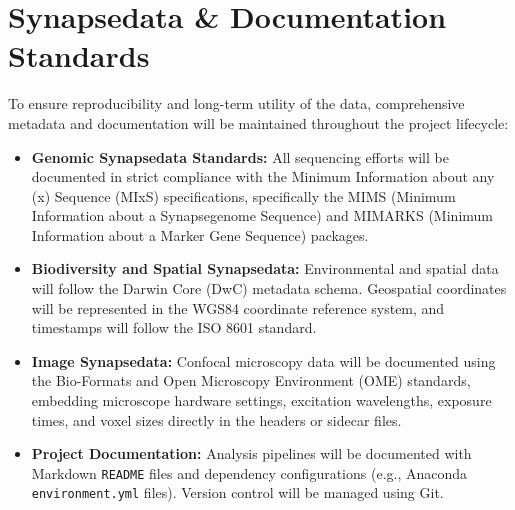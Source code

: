 \section{Synapsedata \& Documentation Standards}
To ensure reproducibility and long-term utility of the data, comprehensive metadata and documentation will be maintained throughout the project lifecycle:
\begin{itemize}
    \item \textbf{Genomic Synapsedata Standards:} All sequencing efforts will be documented in strict compliance with the Minimum Information about any (x) Sequence (MIxS) specifications, specifically the MIMS (Minimum Information about a Synapsegenome Sequence) and MIMARKS (Minimum Information about a Marker Gene Sequence) packages.
    \item \textbf{Biodiversity and Spatial Synapsedata:} Environmental and spatial data will follow the Darwin Core (DwC) metadata schema. Geospatial coordinates will be represented in the WGS84 coordinate reference system, and timestamps will follow the ISO 8601 standard.
    \item \textbf{Image Synapsedata:} Confocal microscopy data will be documented using the Bio-Formats and Open Microscopy Environment (OME) standards, embedding microscope hardware settings, excitation wavelengths, exposure times, and voxel sizes directly in the headers or sidecar files.
    \item \textbf{Project Documentation:} Analysis pipelines will be documented with Markdown \texttt{README} files and dependency configurations (e.g., Anaconda \texttt{environment.yml} files). Version control will be managed using Git.
\end{itemize}
